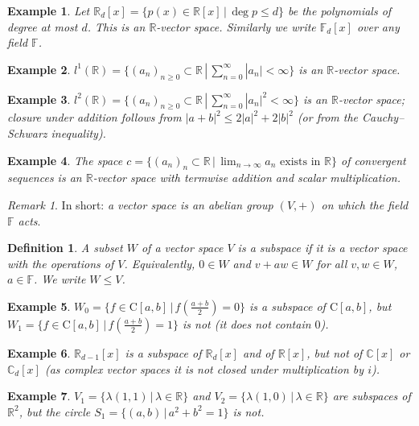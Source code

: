 \documentclass[12pt]{article}
\newcommand{\double}{\hspace{2pt}}
\theoremstyle{breakplain}
\theoremstyle{breakdef}
\newtheorem{definition}[theorem]{Definition}
\newtheorem*{example}{Example}
\theoremstyle{remark}
\newtheorem*{remark}{Remark}
\begin{document}
\begin{example}
    Let $\mathbb{R}_d[x]=\{p(x)\in\mathbb{R}[x] \double | \double \deg p\leq d \}$ be the polynomials of degree at most $d$. This is an $\mathbb{R}$-vector space. Similarly we write $\mathbb{F}_d[x]$ over any field $\mathbb{F}$.
\end{example}
\begin{example}
    $l^1(\mathbb{R})=\{ (a_n)_{n\geq 0} \subset \mathbb{R} \double | \double \sum_{n=0}^\infty |a_n|< \infty \}$ is an $\mathbb{R}$-vector space.
\end{example}
\begin{example}
    $l^2(\mathbb{R})=\{ (a_n)_{n\geq0}\subset\mathbb{R} \double | \double \sum_{n=0}^\infty |a_n|^2 <\infty \}$ is an $\mathbb{R}$-vector space; closure under addition follows from $|a+b|^2\leq 2|a|^2+2|b|^2$ (or from the Cauchy--Schwarz inequality).
\end{example}
\begin{example}
    The space $c=\{ (a_n)_n \subset \mathbb{R}\double | \double \lim_{n\to \infty}a_n \text{ exists in } \mathbb{R} \}$ of convergent sequences is an $\mathbb{R}$-vector space with termwise addition and scalar multiplication.
\end{example}
\begin{remark}
    In short: \emph{a vector space is an abelian group $(V,+)$ on which the field $\mathbb{F}$ acts}.
\end{remark}
\begin{definition}
    A subset $W$ of a vector space $V$ is a \emph{subspace} if it is a vector space with the operations of $V$. Equivalently, $0\in W$ and $v+aw\in W$ for all $v,w\in W$, $a\in\mathbb{F}$. We write $W\leq V$.
\end{definition}
\begin{example}
    $W_0=\{ f\in \mathrm{C}[a,b] \double | \double f(\frac{a+b}{2})=0\}$ is a subspace of $\mathrm{C}[a,b]$, but $W_1=\{ f\in \mathrm{C}[a,b] \double | \double f(\frac{a+b}{2})=1\}$ is not (it does not contain $0$).
\end{example}
\begin{example}
   $\mathbb{R}_{d-1}[x]$ is a subspace of $\mathbb{R}_d[x]$ and of $\mathbb{R}[x]$, but not of $\mathbb{C}[x]$ or $\mathbb{C}_d[x]$ (as complex vector spaces it is not closed under multiplication by $i$).
\end{example}
\begin{example}
    $V_1=\{ \lambda(1,1) \double | \double \lambda \in \mathbb{R}\}$ and $V_2=\{ \lambda(1,0) \double | \double \lambda \in \mathbb{R}\}$ are subspaces of $\mathbb{R}^2$, but the circle $S_1=\{ (a,b) \double | \double a^2+b^2=1\}$ is not.
\end{example}
\end{document}

